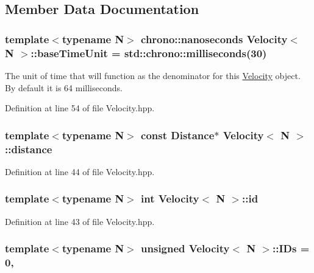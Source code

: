 \subsection{Member Data Documentation}
\hypertarget{struct_velocity_a70e2af5664f11aeb266920916c271712}{
\subsubsection[{base\-Time\-Unit}]{\setlength{\rightskip}{0pt plus 5cm}template$<$typename N$>$ chrono\-::nanoseconds {\bf Velocity}$<$ N $>$\-::base\-Time\-Unit = std\-::chrono\-::milliseconds(30)\hspace{0.3cm}{\ttfamily [protected]}}}\label{struct_velocity_a70e2af5664f11aeb266920916c271712}
The unit of time that will function as the denominator for this \hyperlink{struct_velocity}{Velocity} object. By default it is 64 milliseconds. 

Definition at line 54 of file Velocity.\-hpp.

\hypertarget{struct_velocity_a3f3d268a5d9452ad912c19cfcc7c0394}{
\subsubsection[{distance}]{\setlength{\rightskip}{0pt plus 5cm}template$<$typename N$>$ const {\bf Distance}$\ast$ {\bf Velocity}$<$ N $>$\-::distance\hspace{0.3cm}{\ttfamily [protected]}}}\label{struct_velocity_a3f3d268a5d9452ad912c19cfcc7c0394}


Definition at line 44 of file Velocity.\-hpp.

\hypertarget{struct_velocity_a3f33b62ecfeeeb79c13cd732fbb3a05c}{
\subsubsection[{id}]{\setlength{\rightskip}{0pt plus 5cm}template$<$typename N$>$ int {\bf Velocity}$<$ N $>$\-::id\hspace{0.3cm}{\ttfamily [protected]}}}\label{struct_velocity_a3f33b62ecfeeeb79c13cd732fbb3a05c}


Definition at line 43 of file Velocity.\-hpp.

\hypertarget{struct_velocity_a4ebc19cb1b4fc60b609556073a1d8b36}{
\subsubsection[{I\-Ds}]{\setlength{\rightskip}{0pt plus 5cm}template$<$typename N$>$ unsigned {\bf Velocity}$<$ N $>$\-::I\-Ds = 0\hspace{0.3cm}{\ttfamily [static]}, {\ttfamily [protected]}}}\label{struct_velocity_a4ebc19cb1b4fc60b609556073a1d8b36}


